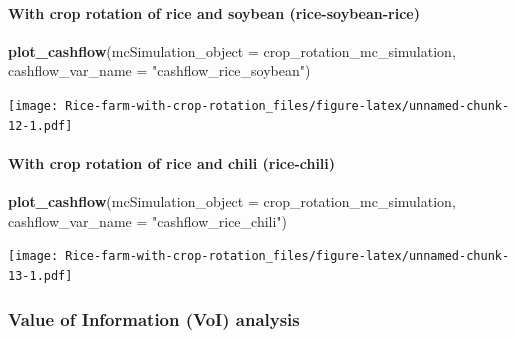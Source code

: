 \documentclass[
]{article}
\newenvironment{Shaded}{\begin{snugshade}}{\end{snugshade}}
\newcommand{\AttributeTok}[1]{\textcolor[rgb]{0.13,0.29,0.53}{#1}}
\newcommand{\DecValTok}[1]{\textcolor[rgb]{0.00,0.00,0.81}{#1}}
\newcommand{\FunctionTok}[1]{\textcolor[rgb]{0.13,0.29,0.53}{\textbf{#1}}}
\newcommand{\NormalTok}[1]{#1}
\newcommand{\OtherTok}[1]{\textcolor[rgb]{0.56,0.35,0.01}{#1}}
\newcommand{\SpecialCharTok}[1]{\textcolor[rgb]{0.81,0.36,0.00}{\textbf{#1}}}
\newcommand{\StringTok}[1]{\textcolor[rgb]{0.31,0.60,0.02}{#1}}
\begin{document}
\hypertarget{with-crop-rotation-of-rice-and-soybean-rice-soybean-rice}{%
\paragraph{With crop rotation of rice and soybean
(rice-soybean-rice)}\label{with-crop-rotation-of-rice-and-soybean-rice-soybean-rice}}

\begin{Shaded}
\begin{Highlighting}[]
\FunctionTok{plot\_cashflow}\NormalTok{(}\AttributeTok{mcSimulation\_object =}\NormalTok{ crop\_rotation\_mc\_simulation, }\AttributeTok{cashflow\_var\_name =} \StringTok{"cashflow\_rice\_soybean"}\NormalTok{)}
\end{Highlighting}
\end{Shaded}

\texttt{[image: Rice-farm-with-crop-rotation\_files/figure-latex/unnamed-chunk-12-1.pdf]}

\hypertarget{with-crop-rotation-of-rice-and-chili-rice-chili}{%
\paragraph{With crop rotation of rice and chili
(rice-chili)}\label{with-crop-rotation-of-rice-and-chili-rice-chili}}

\begin{Shaded}
\begin{Highlighting}[]
\FunctionTok{plot\_cashflow}\NormalTok{(}\AttributeTok{mcSimulation\_object =}\NormalTok{ crop\_rotation\_mc\_simulation, }\AttributeTok{cashflow\_var\_name =} \StringTok{"cashflow\_rice\_chili"}\NormalTok{)}
\end{Highlighting}
\end{Shaded}

\texttt{[image: Rice-farm-with-crop-rotation\_files/figure-latex/unnamed-chunk-13-1.pdf]}

\hypertarget{value-of-information-voi-analysis}{%
\subsubsection{Value of Information (VoI)
analysis}\label{value-of-information-voi-analysis}}

\begin{Shaded}
\end{Shaded}
\end{document}
